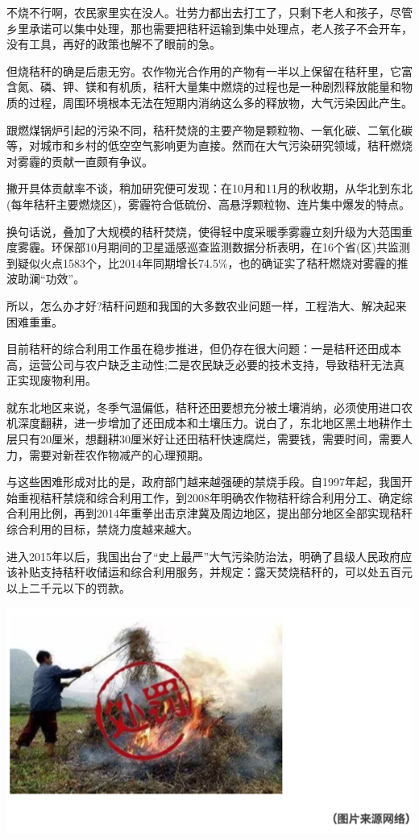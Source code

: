 \documentclass[]{book}
\begin{document}
不烧不行啊，农民家里实在没人。壮劳力都出去打工了，只剩下老人和孩子，尽管乡里承诺可以集中处理，那也需要把秸秆运输到集中处理点，老人孩子不会开车，没有工具，再好的政策也解不了眼前的急。

但烧秸秆的确是后患无穷。农作物光合作用的产物有一半以上保留在秸秆里，它富含氮、磷、钾、镁和有机质，秸秆大量集中燃烧的过程也是一种剧烈释放能量和物质的过程，周围环境根本无法在短期内消纳这么多的释放物，大气污染因此产生。

跟燃煤锅炉引起的污染不同，秸秆焚烧的主要产物是颗粒物、一氧化碳、二氧化碳等，对城市和乡村的低空空气影响更为直接。然而在大气污染研究领域，秸秆燃烧对雾霾的贡献一直颇有争议。

撇开具体贡献率不谈，稍加研究便可发现：在10月和11月的秋收期，从华北到东北(每年秸秆主要燃烧区)，雾霾符合低硫份、高悬浮颗粒物、连片集中爆发的特点。

换句话说，叠加了大规模的秸秆焚烧，使得轻中度采暖季雾霾立刻升级为大范围重度雾霾。环保部10月期间的卫星遥感巡查监测数据分析表明，在16个省(区)共监测到疑似火点1583个，比2014年同期增长74.5\%，也的确证实了秸秆燃烧对雾霾的推波助澜``功效''。

所以，怎么办才好?秸秆问题和我国的大多数农业问题一样，工程浩大、解决起来困难重重。

目前秸秆的综合利用工作虽在稳步推进，但仍存在很大问题：一是秸秆还田成本高，运营公司与农户缺乏主动性;二是农民缺乏必要的技术支持，导致秸秆无法真正实现废物利用。

就东北地区来说，冬季气温偏低，秸秆还田要想充分被土壤消纳，必须使用进口农机深度翻耕，进一步增加了还田成本和土壤压力。说白了，东北地区黑土地耕作土层只有20厘米，想翻耕30厘米好让还田秸秆快速腐烂，需要钱，需要时间，需要人力，需要对新茬农作物减产的心理预期。

与这些困难形成对比的是，政府部门越来越强硬的禁烧手段。自1997年起，我国开始重视秸秆禁烧和综合利用工作，到2008年明确农作物秸秆综合利用分工、确定综合利用比例，再到2014年重拳出击京津冀及周边地区，提出部分地区全部实现秸秆综合利用的目标，禁烧力度越来越大。

进入2015年以后，我国出台了``史上最严''大气污染防治法，明确了县级人民政府应该补贴支持秸秆收储运和综合利用服务，并规定：露天焚烧秸秆的，可以处五百元以上二千元以下的罚款。

\includegraphics[width=8.33in]{images/stalk3}
\end{document}
